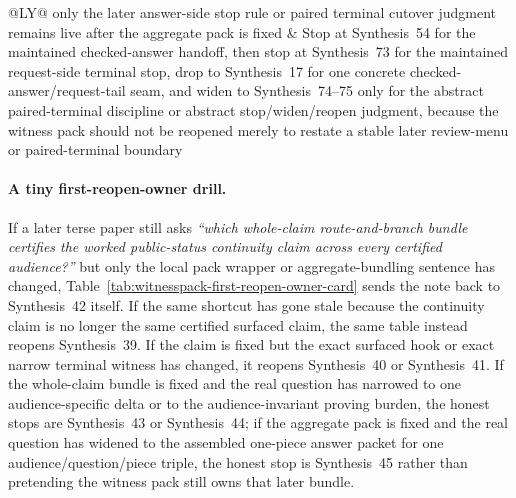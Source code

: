\documentclass[11pt]{article}
\begin{document}
\begin{table}[t]
\begin{tabularx}{\linewidth}{@{}LY@{}}
only the later answer-side stop rule or paired terminal cutover judgment remains live after the aggregate pack is fixed & Stop at Synthesis~54 for the maintained checked-answer handoff, then stop at Synthesis~73 for the maintained request-side terminal stop, drop to Synthesis~17 for one concrete checked-answer/request-tail seam, and widen to Synthesis~74--75 only for the abstract paired-terminal discipline or abstract stop/widen/reopen judgment, because the witness pack should not be reopened merely to restate a stable later review-menu or paired-terminal boundary \\
\bottomrule
\end{tabularx}
\caption{A compact witness-pack first-reopen-owner card. This is the smallest owner-cutover map later terse papers can quote directly when one maintained aggregate witness-pack shortcut has gone stale and the remaining task is to recover which narrower or wider owner now regains authority first.}
\label{tab:witnesspack-first-reopen-owner-card}
\end{table}

\paragraph{A tiny first-reopen-owner drill.}
If a later terse paper still asks \emph{``which whole-claim route-and-branch bundle certifies the worked public-status continuity claim across every certified audience?''} but only the local pack wrapper or aggregate-bundling sentence has changed, Table~\ref{tab:witnesspack-first-reopen-owner-card} sends the note back to Synthesis~42 itself. If the same shortcut has gone stale because the continuity claim is no longer the same certified surfaced claim, the same table instead reopens Synthesis~39. If the claim is fixed but the exact surfaced hook or exact narrow terminal witness has changed, it reopens Synthesis~40 or Synthesis~41. If the whole-claim bundle is fixed and the real question has narrowed to one audience-specific delta or to the audience-invariant proving burden, the honest stops are Synthesis~43 or Synthesis~44; if the aggregate pack is fixed and the real question has widened to the assembled one-piece answer packet for one audience/question/piece triple, the honest stop is Synthesis~45 rather than pretending the witness pack still owns that later bundle.\cite{series:workedexample,series:challengeanswerreviewmenus,series:pairedterminalcitationdiscipline,series:pairedterminalcutoverrules}
\end{document}
